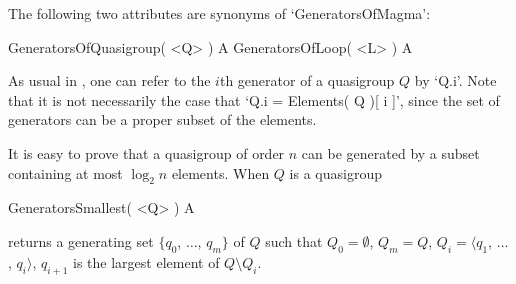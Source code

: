 
The following two attributes are synonyms of `GeneratorsOfMagma':

\>GeneratorsOfQuasigroup( <Q> ) A
\>GeneratorsOfLoop( <L> ) A

As usual in {\GAP}, one can refer to the $i$th generator of a quasigroup $Q$ by
`Q.i'. Note that it is not necessarily the case that `Q.i = Elements( Q )[ i
]', since the set of generators can be a proper subset of the elements.

It is easy to prove that a quasigroup of order $n$ can be generated by a subset
containing at most $\log_2{n}$ elements. When $Q$ is a quasigroup

\>GeneratorsSmallest( <Q> ) A

returns a generating set $\{q_0$, $\dots$, $q_m\}$ of $Q$ such that
$Q_0=\emptyset$, $Q_m=Q$, $Q_i=\langle q_1$, $\dots$, $q_i \rangle$, $q_{i+1}$
is the largest element of $Q\setminus Q_i$.

